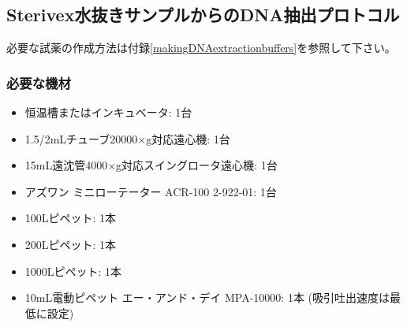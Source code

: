 \documentclass[titlepage,10pt,a4paper,uplatex]{jsbook}
\begin{document}
\subsection{Sterivex水抜きサンプルからのDNA抽出プロトコル}

必要な試薬の作成方法は付録\ref{makingDNAextractionbuffers}を参照して下さい。

\subsubsection{必要な機材}
\begin{itemize}
\item 恒温槽またはインキュベータ: 1台
\item 1.5/2mLチューブ20000×g対応遠心機: 1台
\item 15mL遠沈管4000×g対応スイングロータ遠心機: 1台
\item アズワン ミニローテーター ACR-100 2-922-01: 1台
\item 100{\textmu}Lピペット: 1本
\item 200{\textmu}Lピペット: 1本
\item 1000{\textmu}Lピペット: 1本
\item 10mL電動ピペット エー・アンド・デイ MPA-10000: 1本 (吸引吐出速度は最低に設定)
\end{itemize}
\end{document}
